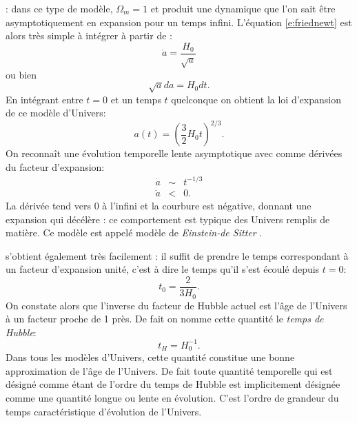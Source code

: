: dans ce type de modèle, $\Omega_m=1$ et produit une dynamique que l'on sait être asymptotiquement en expansion pour un temps infini. L'équation \ref{e:friednewt} est alors très simple à intégrer à partir de :
\begin{equation}
\dot a=\frac{H_0}{\sqrt{a}}
\end{equation}
ou bien
\begin{equation}
\sqrt{a}da=H_0 dt.
\end{equation}
En intégrant entre $t=0$ et un temps $t$ quelconque on obtient la loi d'expansion de ce modèle d'Univers:
\begin{equation}
a(t)=\left(\frac{3}{2}H_0 t\right)^{2/3}.
\end{equation}
On reconnaît une évolution temporelle lente asymptotique avec comme dérivées du facteur d'expansion:
\begin{eqnarray}
\dot a &\sim& t^{-1/3}\\
\ddot a &<&0.
\end{eqnarray}
La dérivée tend vers 0 à l'infini et la courbure est négative, donnant une expansion qui décélère : ce comportement est typique des Univers remplis de matière. Ce modèle est appelé modèle de \textit{Einstein-de Sitter} .

 s'obtient également très facilement : il suffit de prendre le temps correspondant à un facteur d'expansion unité, c'est à dire le temps qu'il s'est écoulé depuis $t=0$:
\begin{equation}
t_0=\frac{2}{3H_0}.
\end{equation}
On constate alors que l'inverse du facteur de Hubble actuel est l'âge de l'Univers à un facteur proche de 1 près. De fait on nomme cette quantité le \textit{temps de Hubble}:
\begin{equation}
t_H=H_0^{-1}.
\end{equation} 
Dans tous les modèles d'Univers, cette quantité constitue une bonne approximation de l'âge de l'Univers. De fait toute quantité temporelle qui est désigné comme étant de l'ordre du temps de Hubble  est implicitement désignée comme une quantité longue ou lente en évolution. C'est l'ordre de grandeur du temps caractéristique d'évolution de l'Univers.


